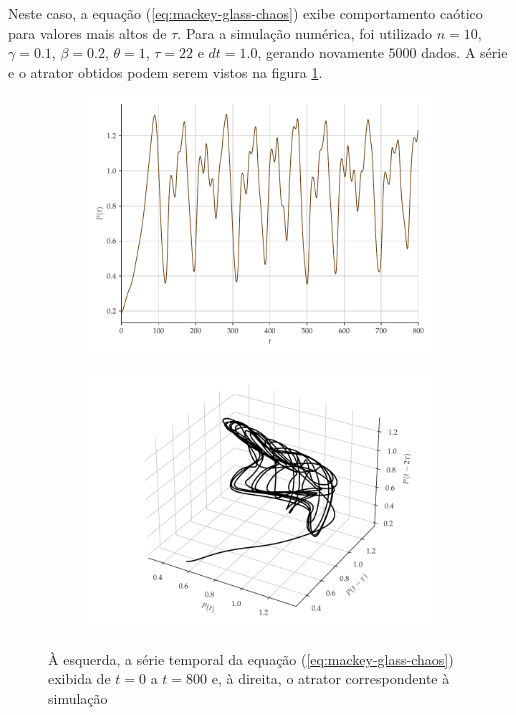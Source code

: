 \documentclass{article}
\begin{document}
Neste caso, a equação (\ref{eq:mackey-glass-chaos}) exibe comportamento caótico para valores mais altos de $\tau$. Para a simulação numérica, foi utilizado $n = 10$, $\gamma = 0.1$, $\beta = 0.2$, $\theta = 1$, $\tau = 22$ e $dt = 1.0$, gerando novamente $5000$ dados. A série e o atrator obtidos podem serem vistos na figura \ref{fig:mackey-glass}.
\begin{figure}[H]
     \begin{subfigure}[t]{0.2\textwidth}
         \includegraphics[scale=0.2]{serie-mackeyglass.pdf}
     \end{subfigure}
     \centering
     \begin{subfigure}[t]{0.2\textwidth}
         \includegraphics[scale=0.2]{atrator-mackeyglass.pdf}
     \end{subfigure}
     \caption{À esquerda, a série temporal da equação (\ref{eq:mackey-glass-chaos}) exibida de $t = 0 $ a $t = 800$ e, à direita, o atrator correspondente à simulação}
     \label{fig:mackey-glass}
\end{figure}
\end{document}
